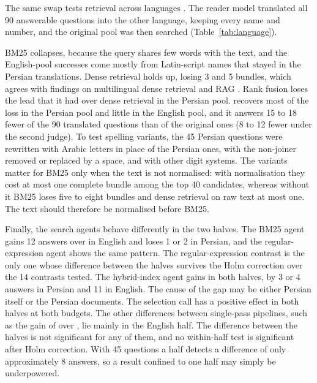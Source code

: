 The same swap tests retrieval across languages \citep{asai2021xorqa,longpre2021mkqa}. The reader model translated all 90 answerable questions into the other language, keeping every name and number, and the original pool was then searched (Table~\ref{tab:language}).

BM25 collapses, because the query shares few words with the text, and the English-pool successes come mostly from Latin-script names that stayed in the Persian translations. Dense retrieval holds up, losing 3 and 5 bundles, which agrees with findings on multilingual dense retrieval and RAG \citep{chen2024bgem3,amiraz2025crosslingual,chirkova2024mrag}. Rank fusion loses the lead that it had over dense retrieval in the Persian pool. \hr{} recovers most of the loss in the Persian pool and little in the English pool, and it answers 15 to 18 fewer of the 90 translated questions than of the original ones (8 to 12 fewer under the second judge). %
To test spelling variants, the 45 Persian questions were rewritten with Arabic letters in place of the Persian ones, with the non-joiner removed or replaced by a space, and with other digit systems. The variants matter for BM25 only when the text is not normalised: with normalisation they cost at most one complete bundle among the top 40 candidates, whereas without it BM25 loses five to eight bundles and dense retrieval on raw text at most one. The text should therefore be normalised before BM25.

Finally, the search agents behave differently in the two halves. The BM25 agent gains 12 answers over \hybrid{} in English and loses 1 or 2 in Persian, and the regular-expression agent shows the same pattern. The regular-expression contrast is the only one whose difference between the halves survives the Holm correction over the 14 contrasts tested. The hybrid-index agent gains in both halves, by 3 or 4 answers in Persian and 11 in English. The cause of the gap may be either Persian itself or the Persian documents. The selection call has a positive effect in both halves at both budgets. The other differences between single-pass pipelines, such as the gain of \hr{} over \hybrid{}, lie mainly in the English half. The difference between the halves is not significant for any of them, and no within-half test is significant after Holm correction. With 45 questions a half detects a difference of only approximately 8 answers, so a result confined to one half may simply be underpowered.

